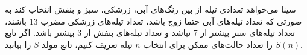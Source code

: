 \p              
  سینا می‌خواهد تعدادی تیله از بین رنگ‌های آبی، زرشکی، سبز و بنفش انتخاب کند به صورتی که تعداد تیله‌های آبی حتما زوج باشد، تعداد تیله‌های زرشکی مضرب 13 باشند، تعداد تیله‌های سبز بیشتر از 7 نباشد و تعداد تیله‌های بنفش از 3 بیشتر باشد. اگر تابع $S(n)$ را تعداد حالت‌های ممکن برای انتخاب $n$ تیله تعریف کنیم، تابع مولد $S$ را بیابید.
